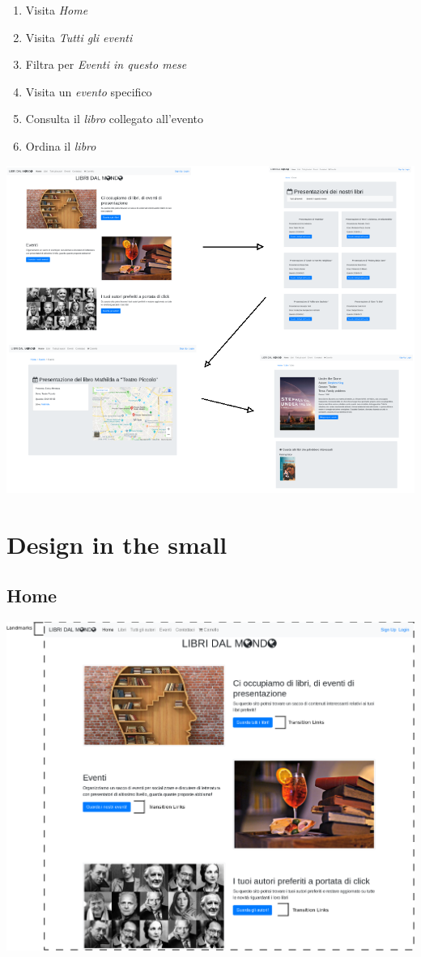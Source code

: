 \documentclass[12pt,a4paper,oneside]{report}
\begin{document}
\begin{enumerate}
	\item Visita \textit{Home}
	\item Visita \textit{Tutti gli eventi}
	\item Filtra per \textit{Eventi in questo mese}
	\item Visita un \textit{evento} specifico
	\item Consulta il \textit{libro} collegato all'evento
	\item Ordina il \textit{libro}
\end{enumerate}

\includegraphics[width=1\textwidth]{scenario_3}

\newpage

\chapter{Design in the small}

\section{Home}

\includegraphics[width=1\textwidth]{home}
\end{document}
